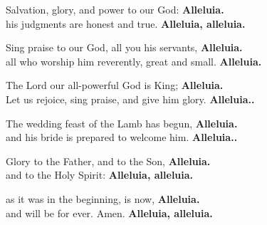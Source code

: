 Salvation, glory, and power to our God:
\textbf{Alleluia.}\\
his judgments are honest and true.
\textbf{Alleluia, alleluia.}

Sing praise to our God, all you his servants,
\textbf{Alleluia.}\\
all who worship him reverently, great and small.
\textbf{Alleluia.}

The Lord our all-powerful God is King;
\textbf{Alleluia.}\\
Let us rejoice, sing praise, and give him glory.
\textbf{Alleluia..}

The wedding feast of the Lamb has begun,
\textbf{Alleluia.}\\
and his bride is prepared to welcome him.
\textbf{Alleluia..}

Glory to the Father, and to the Son,
\textbf{Alleluia.}\\
and to the Holy Spirit:
\textbf{Alleluia, alleluia.}

as it was in the beginning, is now,
\textbf{Alleluia.}\\
and will be for ever. Amen.
\textbf{Alleluia, alleluia.}